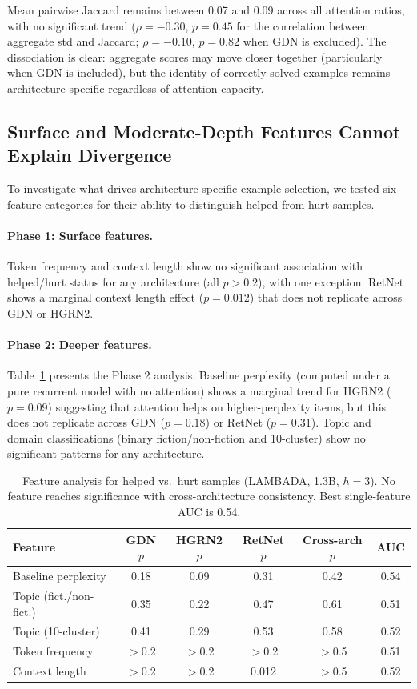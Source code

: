 \documentclass[11pt]{article}
\begin{document}
Mean pairwise Jaccard remains between 0.07 and 0.09 across all attention ratios, with no significant trend ($\rho = -0.30$, $p = 0.45$ for the correlation between aggregate std and Jaccard; $\rho = -0.10$, $p = 0.82$ when GDN is excluded). The dissociation is clear: aggregate scores may move closer together (particularly when GDN is included), but the identity of correctly-solved examples remains architecture-specific regardless of attention capacity.

\subsection{Surface and Moderate-Depth Features Cannot Explain Divergence}
\label{sec:features}

To investigate what drives architecture-specific example selection, we tested six feature categories for their ability to distinguish helped from hurt samples.

\paragraph{Phase 1: Surface features.}
Token frequency and context length show no significant association with helped/hurt status for any architecture (all $p > 0.2$), with one exception: RetNet shows a marginal context length effect ($p = 0.012$) that does not replicate across GDN or HGRN2.

\paragraph{Phase 2: Deeper features.}
Table~\ref{tab:features} presents the Phase 2 analysis. Baseline perplexity (computed under a pure recurrent model with no attention) shows a marginal trend for HGRN2 ($p = 0.09$) suggesting that attention helps on higher-perplexity items, but this does not replicate across GDN ($p = 0.18$) or RetNet ($p = 0.31$). Topic and domain classifications (binary fiction/non-fiction and 10-cluster) show no significant patterns for any architecture.

\begin{table}[t]
\centering
\caption{Feature analysis for helped vs.\ hurt samples (LAMBADA, 1.3B, $h=3$). No feature reaches significance with cross-architecture consistency. Best single-feature AUC is 0.54.}
\label{tab:features}
\begin{tabular}{lccccc}
\toprule
Feature & GDN $p$ & HGRN2 $p$ & RetNet $p$ & Cross-arch $p$ & AUC \\
\midrule
Baseline perplexity & 0.18 & 0.09 & 0.31 & 0.42 & 0.54 \\
Topic (fict./non-fict.) & 0.35 & 0.22 & 0.47 & 0.61 & 0.51 \\
Topic (10-cluster) & 0.41 & 0.29 & 0.53 & 0.58 & 0.52 \\
Token frequency & $>$0.2 & $>$0.2 & $>$0.2 & $>$0.5 & 0.51 \\
Context length & $>$0.2 & $>$0.2 & 0.012 & $>$0.5 & 0.52 \\
\bottomrule
\end{tabular}
\end{table}
\end{document}
